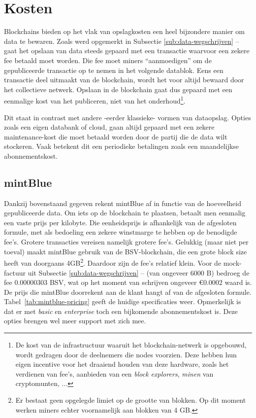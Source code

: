 \section{Kosten}
\label{sub:kosten}

Blockchains bieden op het vlak van opslagkosten een heel bijzondere manier om data te bewaren. Zoals werd opgemerkt in Subsectie \ref{sub:data-wegschrijven} --  gaat het opslaan van data steeds gepaard met een transactie waarvoor een zekere fee betaald moet worden. Die fee moet miners ``aanmoedigen'' om de gepubliceerde transactie op te nemen in het volgende datablok. Eens een transactie deel uitmaakt van de blockchain, wordt het voor altijd bewaard door het collectieve netwerk. Opslaan in de blockchain gaat dus gepaard met een eenmalige kost van het publiceren, niet van het onderhoud\footnote{De kost van de infrastructuur waaruit het blockchain-netwerk is opgebouwd, wordt gedragen door de deelnemers die nodes voorzien. Deze hebben hun eigen incentive voor het draaiend houden van deze hardware, zoals het verdienen van fee's, aanbieden van een \textit{block explorers}, \textit{minen} van cryptomunten, ...}. 

Dit staat in contrast met andere -eerder klassieke- vormen van dataopslag. Opties zoals een eigen databank of cloud, gaan altijd gepaard met een zekere maintenance-kost die moet betaald worden door de partij die de data wilt stockeren. 
Vaak betekent dit een periodieke betalingen zoals een maandelijkse abonnementskost.

\subsection{mintBlue}
\label{sub:mintblue}

Dankzij bovenstaand gegeven rekent mintBlue af in functie van de hoeveelheid gepubliceerde data. Om iets op de blockchain te plaatsen, betaalt men eenmalig een vaste prijs per kilobyte. Die eenheidsprijs is afhankelijk van de afgesloten formule, met als bedoeling een zekere winstmarge te hebben op de benodigde fee's. Grotere transacties vereisen namelijk grotere fee's. Gelukkig (maar niet per toeval) maakt mintBlue gebruik van de BSV-blockchain, die een grote block size heeft van doorgaans 4GB\footnote{Er bestaat geen opgelegde limiet op de grootte van blokken. Op dit moment werken miners echter voornamelijk aan blokken van 4 GB.}. Daardoor zijn de fee's relatief klein. Voor de mock-factuur uit Subsectie \ref{sub:data-wegschrijven} --  (van ongeveer 6000 B) bedroeg de fee 0.00000303 BSV, wat op het moment van schrijven ongeveer \euro 0.0002 waard is. De prijs die mintBlue doorrekent aan de klant hangt af van de afgesloten formule. Tabel~\ref{tab:mintblue-pricing} geeft de huidige specificaties weer. Opmerkelijk is dat er met \textit{basic} en \textit{enterprise} toch een bijkomende abonnementskost is. Deze opties brengen wel meer support met zich mee.

